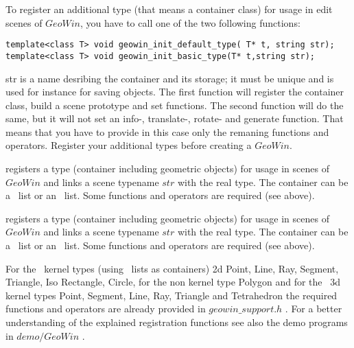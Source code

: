 \begin{enumerate}
To register an additional type (that means a container class) for usage in 
edit scenes of $GeoWin$, you
have to call one of the two following functions:
\begin{verbatim}
template<class T> void geowin_init_default_type( T* t, string str);
template<class T> void geowin_init_basic_type(T* t,string str);
\end{verbatim}
str is a name desribing the container and its storage; it must be unique and is used for instance
for saving objects.
The first function will register the container class, build a scene prototype and set functions.
The second function will do the same, but it will not set an info-, translate-, rotate- and generate
function. That means that you have to provide in this case only the remaning functions and operators.
Register your additional types before creating a $GeoWin$.

\end{enumerate}

{ registers a type (container including geometric objects) for usage
  in scenes of $GeoWin$
  and links a scene typename $str$ with the real type. The container can be a \leda\ list 
  or an \stl\ list. Some functions and operators are required (see above).
}

{ registers a type (container including geometric objects) for usage
  in scenes of $GeoWin$
  and links a scene typename $str$ with the real type. The container can be a \leda\ list
  or an \stl\ list. Some functions and operators are required (see above).
}

For the \cgal\ kernel types (using \stl\ lists as containers)  
2d Point, Line, Ray, Segment, Triangle, Iso Rectangle, Circle,
for the non kernel type Polygon and for the \cgal\ 3d kernel types Point,
Segment, Line, Ray, Triangle and Tetrahedron the required functions and operators
are already provided in $geowin\_support.h$ . For a better understanding of the explained
registration functions see also the demo programs in $demo/GeoWin$ .



